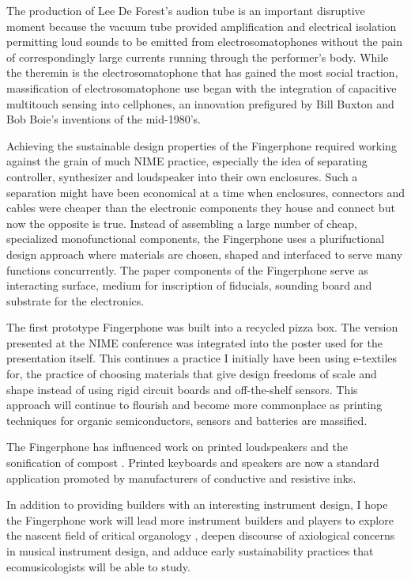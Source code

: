 The production of Lee De Forest's audion tube is an important disruptive moment because the vacuum tube provided amplification and electrical isolation permitting loud sounds to be emitted from electrosomatophones without the pain of correspondingly large currents running through the performer's body. While the theremin is the electrosomatophone that has gained the most social traction, massification of electrosomatophone use began with the integration of capacitive multitouch sensing into cellphones, an innovation prefigured by Bill Buxton \cite{Lee:1985} and Bob Boie's \cite{Boie:1989} inventions of the mid-1980's.
 
Achieving the sustainable design properties of the Fingerphone required working against the grain of much NIME practice, especially the idea of separating controller, synthesizer and loudspeaker into their own enclosures. Such a separation might have been economical at a time when enclosures, connectors and cables were cheaper than the electronic components they house and connect but now the opposite is true. Instead of assembling a large number of cheap, specialized monofunctional components, the Fingerphone uses a plurifuctional design approach where materials are chosen, shaped and interfaced to serve many functions concurrently. The paper components of the Fingerphone serve as interacting surface, medium for inscription of fiducials, sounding board and substrate for the electronics.

The first prototype Fingerphone was built into a recycled pizza box. The version presented at the NIME conference was integrated into the poster used for the presentation itself. This continues a practice I initially have been using e-textiles for, the practice of choosing materials that give design freedoms of scale and shape instead of using rigid circuit boards and off-the-shelf sensors. This approach will continue to flourish and become more commonplace as printing techniques for organic semiconductors, sensors and batteries are massified.
 
The Fingerphone has influenced work on printed loudspeakers \cite{Rowland:2013} and the sonification of compost \cite{Parker}. Printed keyboards and speakers are now a standard application promoted by manufacturers of conductive and resistive inks.
 
In addition to providing builders with an interesting instrument design, I hope the Fingerphone work will lead more instrument builders and players to explore the nascent field of critical organology \cite{TreschDolan:2013}, deepen discourse of axiological concerns in musical instrument design, and adduce early sustainability practices that ecomusicologists will be able to study.



